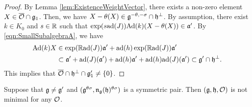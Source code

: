 \begin{proof}
	By Lemma \ref{lem:ExistenceWeightVector}, there exists a non-zero element $X \in \overline{\mathcal{O}} \cap \mathfrak{g}_1$.
	Then, we have $X - \theta(X) \in \mathfrak{g}^{-\theta, -\sigma} \cap \mathfrak{h}^\perp$.
	By assumption, there exist $k \in K_0$ and $s \in \mathbb{R}$ such that $\exp(s\mathrm{ad}(J))\mathrm{Ad}(k)(X - \theta(X)) \in \mathfrak{a'}$.
	By \eqref{eqn:SmallSubalgebraA}, we have
	\begin{align*}
		\mathrm{Ad}(k)X &\in \exp(\mathbb{R} \mathrm{ad}(J))\mathfrak{a'} + \mathrm{ad}(h)\exp(\mathbb{R} \mathrm{ad}(J))\mathfrak{a'} \\
		&\subset \mathfrak{a'} + \mathrm{ad}(J)(\mathfrak{a'}) + \mathrm{ad}(h)\mathfrak{a'} + \mathrm{ad}(h)\mathrm{ad}(J)(\mathfrak{a'}) \subset \mathfrak{g'} \cap \mathfrak{h}^\perp.
	\end{align*}
	This implies that $\overline{\mathcal{O}} \cap \mathfrak{h}^\perp \cap \mathfrak{g}'_1 \neq \left\{0 \right\}$.
\end{proof}

\begin{proposition} \label{prop:NonMinimalSymmetric}
	Suppose that $\mathfrak{g} \neq \mathfrak{g'}$ and $(\mathfrak{g}^{\theta\sigma}, \mathfrak{n}_{\mathfrak{g}}(\mathfrak{h})^{\theta\sigma})$ is a symmetric pair.
	Then $(\mathfrak{g}, \mathfrak{h}, \mathcal{O})$ is not minimal for any $\mathcal{O}$.
\end{proposition}

